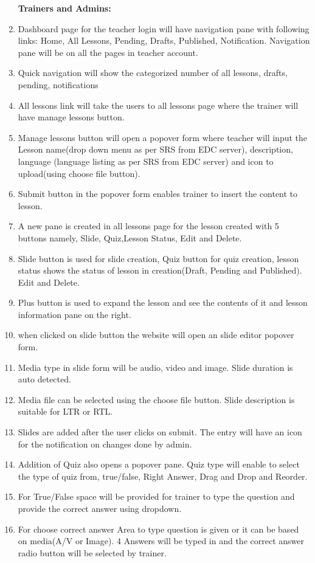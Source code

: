 \documentclass{article}
\begin{document}
\begin{enumerate}
    \textbf{Trainers and Admins:}
    \item Dashboard page for the teacher login will have navigation pane with following links: Home, All Lessons, Pending, Drafts, Published, Notification. Navigation pane will be on all the pages in teacher account.
    \item Quick navigation will show the categorized number of all lessons, drafts, pending, notifications
    \item All lessons link will take the users to all lessons page where the trainer will have manage lessons button.
    \item Manage lessons button will open a popover form where teacher will input the Lesson name(drop down menu as per SRS from EDC server), description, language (language listing as per SRS from EDC server) and icon to upload(using choose file button).
    \item Submit button in the popover form enables trainer to insert the content to lesson.
    \item A new pane is created in all lessons page for the lesson created with 5 buttons namely, Slide, Quiz,Lesson Status, Edit and Delete.
    \item Slide button is used for slide creation, Quiz button for quiz creation, lesson status shows the status of lesson in creation(Draft, Pending and Published). Edit and Delete.
    \item Plus button is used to expand the lesson and see the contents of it and lesson information pane on the right.
    \item when clicked on slide button the website will open an slide editor popover form.
    \item Media type in slide form will be audio, video and image. Slide duration is auto detected.
    \item Media file can be selected using the choose file button. Slide description is suitable for LTR or RTL.
    \item Slides are added after the user clicks on submit. The entry will have an icon for the notification on changes done by admin.
    \item Addition of Quiz also opens a popover pane. Quiz type will enable to select the type of quiz from, true/false, Right Answer, Drag and Drop and Reorder.
    \item For True/False space will be provided for trainer to type the question and provide the correct answer using dropdown.
    \item For choose correct answer Area to type question is given or it can be based on media(A/V or Image). 4 Answers will be typed in and the correct answer radio button will be selected by trainer.

\end{enumerate}
\end{document}

